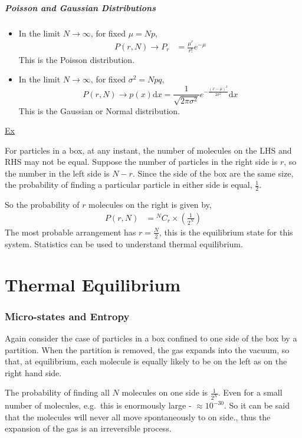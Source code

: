 \documentclass[british]{article}
\renewcommand{\d}{\mathrm{d}} %
\renewcommand{\u}[1]{\underline{#1}} %
\begin{document}
\subsubsection{Poisson and Gaussian Distributions}
\begin{itemize}
	\item In the limit $N\rightarrow \infty$, for fixed $\mu=Np$,
		\begin{align*}
			P(r,N) \rightarrow P_r &= \frac{\mu^r}{r!}e^{-\mu}
		\end{align*}
	This is the Poisson distribution.
	\item In the limit $N\rightarrow \infty$, for fixed $\sigma^2=Npq$,
		\[
			P(r,N) \rightarrow p(x)\d{x} = \frac{1}{\sqrt{2\pi\sigma^2}}e^{-\frac{(x-\mu)^2}{2\sigma^2}}\d{x}
		\]
	This is the Gaussian or Normal distribution.
\end{itemize}
\u{Ex}

For particles in a box, at any instant, the number of molecules on the LHS and RHS may not be equal. Suppose the number of particles in the right side is $r$, so the number in the left side is $N-r$. Since the side of the box are the same size, the probability of finding a particular particle in either side is equal, $\frac{1}{2}$.

So the probability of $r$ molecules on the right is given by,
\begin{align*}
	P(r,N) &= {}^NC_r \times \left( \frac{1}{2^N} \right)
\end{align*}
The most probable arrangement has $r=\frac{N}{2}$, this is the equilibrium state for this system. Statistics can be used to understand thermal equilibrium.

\part{Thermal Equilibrium}
\section{Micro-states and Entropy}
Again consider the case of particles in a box confined to one side of the box by a partition. When the partition is removed, the gas expands into the vacuum, so that, at equilibrium, each molecule is equally likely to be on the left as on the right hand side.

The probability of finding all $N$ molecules on one side is $\frac{1}{2^N}$. Even for a small  number of molecules, e.g.\ this is enormously large - $\approx 10^{-30}$. So it can be said that the molecules will never all move spontaneously to on side., thus the expansion of the gas is an irreversible process.
\end{document}
